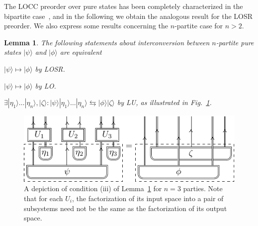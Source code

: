 \documentclass[12pt]{article}
\theoremstyle{plain}
\newtheorem{lem}[theo]{Lemma}
\theoremstyle{definition}
\begin{document}
The LOCC preorder over pure states has been completely characterized in the bipartite case~\cite{nielsen1999conditions}, and in the following we obtain the analogous result for the LOSR preorder.  We also express some results concerning the  $n$-partite case for $n>2$. 


\begin{samepage}
\begin{lem}
    \label{lem:conversion}
    The following statements about interconversion between $n$-partite pure states $|\psi\rangle$ and $|\phi\rangle$ are equivalent 
    \begin{compactenum}[(i)]
        \item  $|\psi\rangle \mapsto |\phi\rangle$ by LOSR.
        \item  $|\psi\rangle \mapsto |\phi\rangle$ by LO.
        \item  $\exists |\eta_1\rangle \dots |\eta_n\rangle, |\zeta\rangle : |\psi\rangle |\eta_1\rangle \dots |\eta_n\rangle \leftrightarrows
          |\phi\rangle |\zeta\rangle$ by LU, as illustrated in Fig.~\ref{main_Lemma_three_parties}.
    \end{compactenum}
\end{lem}
\end{samepage}

\begin{figure}
\centering
    \includegraphics[scale=1]{fig_losr_as_lu.pdf}
    \caption{A depiction of condition (iii) of Lemma~\ref{lem:conversion} for $n = 3$ parties. 
    Note that for each $U_i$, the factorization of its input space into a pair of subsystems need not be the same as the factorization of its output space.}
    \label{main_Lemma_three_parties}
\end{figure}
\end{document}
